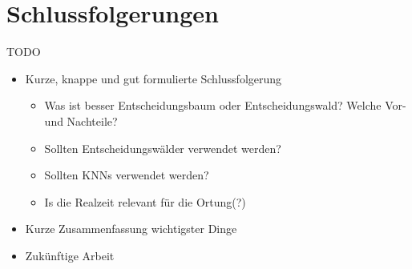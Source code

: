 \chapter{Schlussfolgerungen}
TODO

\begin{itemize}
    \item Kurze, knappe und gut formulierte Schlussfolgerung
    \begin{itemize}
        \item Was ist besser Entscheidungsbaum oder Entscheidungswald? Welche Vor- und Nachteile?
        \item Sollten Entscheidungswälder verwendet werden?
        \item Sollten KNNs verwendet werden?
        \item Is die Realzeit relevant für die Ortung(?)
    \end{itemize}
    \item Kurze Zusammenfassung wichtigster Dinge
    \item Zukünftige Arbeit
\end{itemize}